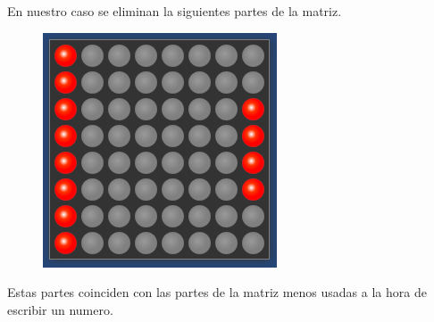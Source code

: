 \documentclass[titlepage]{article}
\begin{document}
	En nuestro caso se eliminan la siguientes partes de la matriz.
\begin{figure}[H]
	\centering
	\includegraphics[width=0.7\linewidth, height=0.4\textheight]{screenshot003}
	\caption{}
	\label{fig:screenshot003}
\end{figure}


	Estas partes coinciden con las partes de la matriz menos usadas a la hora de escribir un numero.

	
	
  
\end{document}
